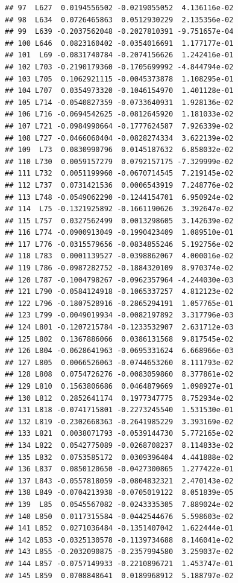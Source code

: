 \documentclass[
]{article}
\begin{document}
\begin{verbatim}
## 97  L627  0.0194556502 -0.0219055052  4.136116e-02
## 98  L634  0.0726465863  0.0512930229  2.135356e-02
## 99  L639 -0.2037562048 -0.2027810391 -9.751657e-04
## 100 L646  0.0823160402 -0.0354016691  1.177177e-01
## 101  L69 -0.0831740784 -0.2074156626  1.242416e-01
## 102 L703 -0.2190179360 -0.1705699992 -4.844794e-02
## 103 L705  0.1062921115 -0.0045373878  1.108295e-01
## 104 L707  0.0354973320 -0.1046154970  1.401128e-01
## 105 L714 -0.0540827359 -0.0733640931  1.928136e-02
## 106 L716 -0.0694542625 -0.0812645920  1.181033e-02
## 107 L721 -0.0984990664 -0.1777624587  7.926339e-02
## 108 L727 -0.0466060404 -0.0828274334  3.622139e-02
## 109  L73  0.0830990796  0.0145187632  6.858032e-02
## 110 L730  0.0059157279  0.0792157175 -7.329999e-02
## 111 L732  0.0051199960 -0.0670714545  7.219145e-02
## 112 L737  0.0731421536  0.0006543919  7.248776e-02
## 113 L748 -0.0549062290 -0.1244154701  6.950924e-02
## 114  L75 -0.1321925892 -0.1661190626  3.392647e-02
## 115 L757  0.0327562499  0.0013298605  3.142639e-02
## 116 L774 -0.0900913049 -0.1990423409  1.089510e-01
## 117 L776 -0.0315579656 -0.0834855246  5.192756e-02
## 118 L783  0.0001139527 -0.0398862067  4.000016e-02
## 119 L786 -0.0987282752 -0.1884320109  8.970374e-02
## 120 L787 -0.1004798267 -0.0962357964 -4.244030e-03
## 121 L790 -0.0584124918 -0.1065337257  4.812123e-02
## 122 L796 -0.1807528916 -0.2865294191  1.057765e-01
## 123 L799 -0.0049019934 -0.0082197892  3.317796e-03
## 124 L801 -0.1207215784 -0.1233532907  2.631712e-03
## 125 L802  0.1367886066  0.0386131568  9.817545e-02
## 126 L804 -0.0628641963 -0.0695331624  6.668966e-03
## 127 L805  0.0066526063 -0.0744653260  8.111793e-02
## 128 L808  0.0754726276 -0.0083059860  8.377861e-02
## 129 L810  0.1563806686  0.0464879669  1.098927e-01
## 130 L812  0.2852641174  0.1977347775  8.752934e-02
## 131 L818 -0.0741715801 -0.2273245540  1.531530e-01
## 132 L819 -0.2302668363 -0.2641985229  3.393169e-02
## 133 L821  0.0038071793 -0.0539144730  5.772165e-02
## 134 L822  0.0542775089 -0.0268708237  8.114833e-02
## 135 L832  0.0753585172  0.0309396404  4.441888e-02
## 136 L837  0.0850120650 -0.0427300865  1.277422e-01
## 137 L843 -0.0557818059 -0.0804832321  2.470143e-02
## 138 L849 -0.0704213938 -0.0705019122  8.051839e-05
## 139  L85  0.0545567082 -0.0243335305  7.889024e-02
## 140 L850  0.0117315584 -0.0442544676  5.598603e-02
## 141 L852  0.0271036484 -0.1351407042  1.622444e-01
## 142 L853 -0.0325130578 -0.1139734688  8.146041e-02
## 143 L855 -0.2032090875 -0.2357994580  3.259037e-02
## 144 L857 -0.0757149933 -0.2210896721  1.453747e-01
## 145 L859  0.0708848641  0.0189968912  5.188797e-02

\end{verbatim}
\end{document}
